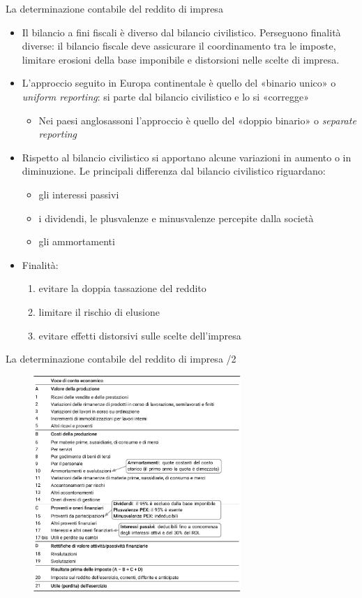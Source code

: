 \documentclass[aspectratio=64,11pt]{beamer}
\begin{document}
\begin{frame}{La determinazione contabile del reddito di impresa}
\begin{itemize}
\item Il bilancio a fini fiscali è diverso dal bilancio civilistico.
Perseguono finalità diverse: il bilancio fiscale deve assicurare il
coordinamento tra le imposte, limitare erosioni della base imponibile e
distorsioni nelle scelte di impresa.
\item L'approccio seguito in Europa continentale è quello del «binario unico» o
\emph{uniform reporting}: si parte dal bilancio civilistico e lo si «corregge»
\begin{itemize}
\item Nei paesi anglosassoni l'approccio è quello del «doppio binario» o
\emph{separate reporting}
\end{itemize}
\item Rispetto al bilancio civilistico si apportano alcune variazioni in aumento o
in diminuzione. Le principali differenza dal bilancio civilistico
riguardano:
\begin{itemize}
\item gli interessi passivi
\item i dividendi, le plusvalenze e minusvalenze percepite dalla società
\item gli ammortamenti
\end{itemize}
\item Finalità:
\begin{enumerate}
\item evitare la doppia tassazione del reddito
\item limitare il rischio di elusione
\item evitare effetti distorsivi sulle scelte dell'impresa
\end{enumerate}
\end{itemize}
\end{frame}


\begin{frame}{La determinazione contabile del reddito di impresa /2}
\begin{figure}
\centering
\includegraphics[height=8.2cm]{./figure/tabella-conto-economico.pdf}
\end{figure}
\end{frame}
\end{document}
